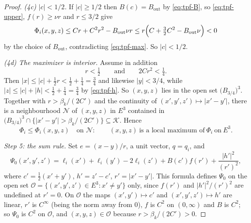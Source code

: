 \begin{proof}
\emph{(4c) $|c|<1/2$.} If $|c|\ge1/2$ then $B(c)=B_{\mathrm{out}}$ by
\eqref{eq:tpf-B}, so \eqref{eq:tpf-upper}, $f(r)\ge\nu r$ and $r\le3/2$ give
\[
  \Phi_i(x,y,z)\le Cr+C^2r^2-B_{\mathrm{out}}\nu r
   \le r\Bigl(C+\tfrac32C^2-B_{\mathrm{out}}\nu\Bigr)<0
\]
by the choice of $B_{\mathrm{out}}$, contradicting \eqref{eq:tpf-max}. So
$|c|<1/2$.

\emph{(4d) The maximizer is interior.} Assume in addition
\begin{equation}\label{eq:tpf-r1}
  r<\tfrac12\qquad\text{and}\qquad 2Cr^2<\tfrac14 .
\end{equation}
Then $|x|\le|c|+\tfrac12r<\tfrac12+\tfrac14=\tfrac34$ and likewise
$|y|<3/4$, while $|z|\le|c|+|h|<\tfrac12+\tfrac14=\tfrac34$ by
\eqref{eq:tpf-h}. So $(x,y,z)$ lies in the open set $\bigl(B_{3/4}\bigr)^3$.
Together with $r>\beta_k/(2C')$ and the continuity of $(x',y',z')\mapsto|x'-y'|$,
there is a neighbourhood $\mathcal N$ of $(x,y,z)$ in $E^3$ contained in
$\bigl(B_{3/4}\bigr)^3\cap\{|x'-y'|>\beta_k/(2C')\}\subseteq\mathcal K$. Hence
\begin{equation}\label{eq:tpf-localmax}
  \Phi_i\le\Phi_i(x,y,z)\quad\text{on }\mathcal N:
  \qquad(x,y,z)\ \text{is a local maximum of}\ \Phi_i\ \text{on}\ E^3 .
\end{equation}

\emph{Step 5: the sum rule.}
Set $e=(x-y)/r$, a unit vector, $q=q_i$, and
\[
  \Psi_0(x',y',z')=\ell_i(x')+\ell_i(y')-2\ell_i(z')
    +B(c')f(r')+\frac{|h'|^2}{(r')^2},
\]
where $c'=\tfrac12(x'+y')$, $h'=z'-c'$, $r'=|x'-y'|$. This formula defines
$\Psi_0$ on the open set $\mathcal O=\{(x',y',z')\in E^3:x'\ne y'\}$ only, since
$f(r')$ and $|h'|^2/(r')^2$ are undefined at $r'=0$. On $\mathcal O$ the maps
$(x',y')\mapsto c'$ and
$(x',y',z')\mapsto h'$ are linear, $r'$ is $C^\infty$ (being the norm away from
$0$), $f$ is $C^2$ on $(0,\infty)$ and $B$ is $C^2$; so $\Psi_0$ is $C^2$ on
$\mathcal O$, and $(x,y,z)\in\mathcal O$ because $r>\beta_k/(2C')>0$.


\end{proof}
